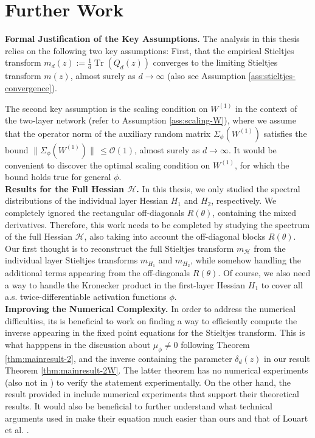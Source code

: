 \documentclass{article}
\begin{document}
\section{Further Work}
\textbf{Formal Justification of the Key Assumptions.} The analysis in this thesis relies on the following two key assumptions: First, that the empirical Stieltjes transform $m_d(z):=\frac{1}{d}\operatorname{Tr}(Q_d(z))$ converges to the limiting Stieltjes transform $m(z)$, almost surely as $d\to\infty$ (also see Assumption \ref{ass:stieltjes-convergence}).
\par
The second key assumption is the scaling condition on $W^{(1)}$ in the context of the two-layer network (refer to Assumption \ref{ass:scaling-W}), where we assume that the operator norm of the auxiliary random matrix $\Sigma_\phi(W^{(1)})$ satisfies the bound $\|\Sigma_\phi(W^{(1)})\|\,\leq\mathcal{O}(1)$, almost surely as $d\to\infty$. It would be convenient to discover the optimal scaling condition on $W^{(1)}$, for which the bound holds true for general $\phi$.
\bigskip
\bigskip
\\
\textbf{Results for the Full Hessian $\mathcal{H}$.} In this thesis, we only studied the spectral distributions of the individual layer Hessian $H_1$ and $H_2$, respectively. We completely ignored the rectangular off-diagonals $R(\theta)$, containing the mixed derivatives. Therefore, this work needs to be completed by studying the spectrum of the full Hessian $\mathcal{H}$, also taking into account the off-diagonal blocks $R(\theta)$. Our first thought is to reconstruct the full Stieltjes transform $m_{\mathcal{H}}$ from the individual layer Stieltjes transforms $m_{H_1}$ and $m_{H_2}$, while somehow handling the additional terms appearing from the off-diagonals $R(\theta)$. Of course, we also need a way to handle the Kronecker product in the first-layer Hessian $H_1$ to cover all a.s. twice-differentiable activation functions $\phi$.
\bigskip
\bigskip
\\
\textbf{Improving the Numerical Complexity.} In order to address the numerical difficulties, its is beneficial to work on finding a way to efficiently compute the inverse appearing in the fixed point equations for the Stieltjes transform. This is what happpens in the discussion about $\mu_\phi\neq0$ following Theorem \ref{thm:mainresult-2}, and the inverse containing the parameter $\delta_d(z)$ in our result Theorem \ref{thm:mainresult-2W}. The latter theorem has no numerical experiments (also not in \cite{louart}) to verify the statement experimentally. On the other hand, the result provided in \cite{benigni, piccolo} include numerical experiments that support their theoretical results. It would also be beneficial to further understand what technical arguments used in \cite{benigni, piccolo} make their equation much easier than ours and that of Louart et al. \cite{louart}.
\end{document}
